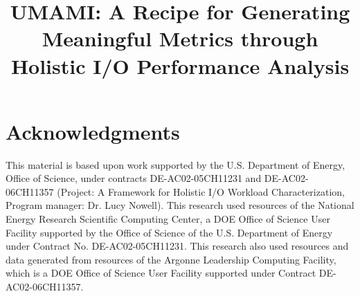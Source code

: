 \documentclass[conference,10pt,compsocconf]{IEEEtran}
\begin{document}
\title{UMAMI: A Recipe for Generating Meaningful Metrics through Holistic
I/O Performance Analysis}
\author{
}
\maketitle













\section*{Acknowledgments}
This material is based upon work supported by the U.S. Department of Energy, Office of Science, under contracts DE-AC02-05CH11231 and DE-AC02-06CH11357 (Project: A Framework for Holistic I/O Workload Characterization, Program manager: Dr. Lucy Nowell).
This research used resources of the National Energy Research Scientific Computing Center, a DOE Office of Science
User Facility supported by the Office of Science of the U.S. Department of Energy under Contract No. DE-AC02-05CH11231.
This research also used resources and data generated from resources of the Argonne Leadership Computing Facility, which is a DOE Office of Science User Facility supported under Contract DE-AC02-06CH11357.

%


\end{document}
